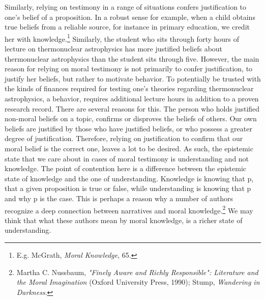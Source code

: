 \documentclass[phdthesis,12pt,final]{wuthesis}
\theoremstyle{definition}
\theoremstyle{definition}
\theoremstyle{definition}
\theoremstyle{definition}
\theoremstyle{remark}
\begin{document}
Similarly, relying on testimony in a range of situations confers justification to one's belief of a proposition. In a robust sense for example, when a child obtains true beliefs from a reliable source, for instance in primary education, we credit her with knowledge.\footnote{E.g. McGrath, \emph{Moral {Knowledge}}, 65.} Similarly, the student who sits through forty hours of lecture on thermonuclear astrophysics has more justified beliefs about thermonuclear astrophysics than the student sits through five. However, the main reason for relying on moral testimony is not primarily to confer justification, to justify her beliefs, but rather to motivate behavior. To potentially be trusted with the kinds of finances required for testing one's theories regarding thermonuclear astrophysics, a behavior, requires additional lecture hours in addition to a proven research record. There are several reasons for this. The person who holds justified non-moral beliefs on a topic, confirms or disproves the beliefs of others. Our own beliefs are justified by those who have justified beliefs, or who possess a greater degree of justification. Therefore, relying on justification to confirm that our moral belief is the correct one, leaves a lot to be desired. As such, the epistemic state that we care about in cases of moral testimony is understanding and not knowledge. The point of contention here is a difference between the epistemic state of knowledge and the one of understanding. Knowledge is knowing that p, that a given proposition is true or false, while understanding is knowing that p and why p is the case. This is perhaps a reason why a number of authors recognize a deep connection between narratives and moral knowledge.\footnote{Martha C. Nussbaum, \emph{"{Finely Aware} and {Richly Responsible}": {Literature} and the {Moral Imagination}} (Oxford University Press, 1990); Stump, \emph{Wandering in {Darkness}}.} We may think that what these authors mean by moral knowledge, is a richer state of understanding.
\end{document}
